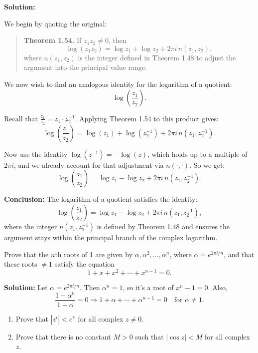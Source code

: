 \textbf{Solution:}  

We begin by quoting the original:

\begin{quote}
\textbf{Theorem 1.54.}  
If \( z_1 z_2 \ne 0 \), then
\[
\log(z_1 z_2) = \log z_1 + \log z_2 + 2\pi i\, n(z_1, z_2),
\]
where \( n(z_1, z_2) \) is the integer defined in Theorem 1.48 to adjust the argument into the principal value range.
\end{quote}

We now wish to find an analogous identity for the logarithm of a quotient:
\[
\log\left( \frac{z_1}{z_2} \right).
\]

Recall that \( \frac{z_1}{z_2} = z_1 \cdot z_2^{-1} \). Applying Theorem 1.54 to this product gives:
\[
\log\left( \frac{z_1}{z_2} \right)
= \log(z_1) + \log(z_2^{-1}) + 2\pi i\, n(z_1, z_2^{-1}).
\]

Now use the identity \( \log(z^{-1}) = -\log(z) \), which holds up to a multiple of \( 2\pi i \), and we already account for that adjustment via \( n(\cdot, \cdot) \). So we get:
\[
\log\left( \frac{z_1}{z_2} \right) = \log z_1 - \log z_2 + 2\pi i\, n(z_1, z_2^{-1}).
\]

\textbf{Conclusion:}  
The logarithm of a quotient satisfies the identity:
\[
\log\left( \frac{z_1}{z_2} \right) = \log z_1 - \log z_2 + 2\pi i\, n(z_1, z_2^{-1}),
\]
where the integer \( n(z_1, z_2^{-1}) \) is defined by Theorem 1.48 and ensures the argument stays within the principal branch of the complex logarithm.


\begin{problembox}
Prove that the \( n \)th roots of 1 are given by \( \alpha, \alpha^2, \ldots, \alpha^n \), where \( \alpha = e^{2\pi i/n} \), and that these roots \( \ne 1 \) satisfy the equation
\[
1 + x + x^2 + \cdots + x^{n-1} = 0.
\]
\end{problembox}

\textbf{Solution:}
Let \( \alpha = e^{2\pi i/n} \). Then \( \alpha^n = 1 \), so it’s a root of \( x^n - 1 = 0 \). Also,
\[
\frac{1 - \alpha^n}{1 - \alpha} = 0 \Rightarrow 1 + \alpha + \cdots + \alpha^{n-1} = 0 \quad \text{for } \alpha \ne 1.
\]

\begin{problembox}
\begin{enumerate}[label=\alph*)]
\item Prove that \( |z^i| < e^{\pi} \) for all complex \( z \ne 0 \).
\item Prove that there is no constant \( M > 0 \) such that \( |\cos z| < M \) for all complex \( z \).
\end{enumerate}
\end{problembox}

